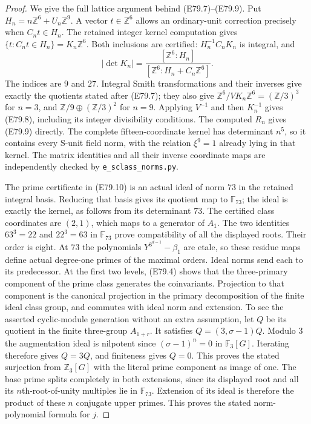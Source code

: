 \begin{proof}
We give the full lattice argument behind (E79.7)--(E79.9).
Put $H_n=n\mathbb Z^6+U_n\mathbb Z^9$. A vector
$t\in\mathbb Z^6$ allows an ordinary-unit correction
precisely when $C_nt\in H_n$. The retained integer
kernel computation gives
$\{t:C_nt\in H_n\}=K_n\mathbb Z^6$.
Both inclusions are certified: $H_n^{-1}C_nK_n$ is
integral, and
\[
 |\det K_n|=
 \frac{[\mathbb Z^6:H_n]}
 {[\mathbb Z^6:H_n+C_n\mathbb Z^6]}.
 \tag{E79.21}
\]
The indices are $9$ and $27$. Integral Smith
transformations and their inverses give exactly the
quotients stated after (E79.7); they also give
$\mathbb Z^6/VK_n\mathbb Z^6=(\mathbb Z/3)^3$
for $n=3$, and $\mathbb Z/9\oplus(\mathbb Z/3)^2$
for $n=9$. Applying $V^{-1}$ and then $K_n^{-1}$ gives
(E79.8), including its integer divisibility conditions.
The computed $R_n$ gives (E79.9) directly. The complete
fifteen-coordinate kernel has determinant $n^5$, so it
contains every S-unit field norm, with the relation
$\xi^9=1$ already lying in that kernel. The matrix
identities and all their inverse coordinate maps are
independently checked by \texttt{e\_sclass\_norms.py}.

The prime certificate in (E79.10) is an actual ideal
of norm $73$ in the retained integral basis. Reducing
that basis gives its quotient map to $\mathbb F_{73}$;
the ideal is exactly the kernel, as follows from its
determinant $73$. The certified class coordinates are
$(2,1)$, which maps to a generator of $A_1$.
The two identities $63^3=22$ and $22^3=63$ in
$\mathbb F_{73}$ prove compatibility of all the
displayed roots. Their order is eight. At $73$ the
polynomials $Y^{3^{d-1}}-\beta_1$ are etale, so these
residue maps define actual degree-one primes of the
maximal orders. Ideal norms send each to its predecessor.
At the first two levels, (E79.4) shows that the three-primary
component of the prime class generates the coinvariants.
Projection to that component is the canonical projection
in the primary decomposition of the finite ideal class
group, and commutes with ideal norm and extension.
To see the asserted
cyclic-module generation without an extra assumption,
let $Q$ be its quotient in the finite three-group
$A_{1+r}$. It satisfies
$Q=(3,\sigma-1)Q$. Modulo $3$ the augmentation ideal
is nilpotent since $(\sigma-1)^n=0$ in
$\mathbb F_3[G]$. Iterating therefore gives $Q=3Q$,
and finiteness gives $Q=0$. This proves the stated
surjection from $\mathbb Z_3[G]$ with the literal
prime component as image of one. The base prime splits
completely in both extensions, since its displayed root
and all its $n$th-root-of-unity multiples lie in
$\mathbb F_{73}$. Extension of its ideal is therefore
the product of these $n$ conjugate upper primes. This
proves the stated norm-polynomial formula for $j$.


\end{proof}
